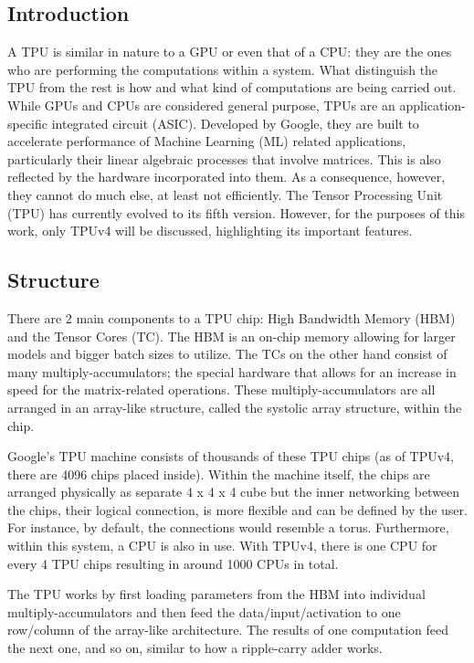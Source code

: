 \subsection{Introduction}
\label{subsec:introduction2}
A TPU is similar in nature to a GPU or even that of a CPU: they are the ones who are performing the computations within a system.
What distinguish the TPU from the rest is how and what kind of computations are being carried out.
While GPUs and CPUs are considered general purpose, TPUs are an application-specific integrated circuit (ASIC).
Developed by Google, they are built to accelerate performance of Machine Learning (ML) related applications, particularly their linear algebraic processes that involve matrices.
This is also reflected by the hardware incorporated into them.
As a consequence, however, they cannot do much else, at least not efficiently.
The Tensor Processing Unit (TPU) has currently evolved to its fifth version.
However, for the purposes of this work, only TPUv4 will be discussed, highlighting its important features.

\subsection{Structure}
\label{subsec:structure}
There are 2 main components to a TPU chip: High Bandwidth Memory (HBM) and the Tensor Cores (TC).
The HBM is an on-chip memory allowing for larger models and bigger batch sizes to utilize.
The TCs on the other hand consist of many multiply-accumulators; the special hardware that allows for an increase in speed for the matrix-related operations.
These multiply-accumulators are all arranged in an array-like structure, called the systolic array structure, within the chip.

Google’s TPU machine consists of thousands of these TPU chips (as of TPUv4, there are 4096 chips placed inside).
Within the machine itself, the chips are arranged physically as separate 4 x 4 x 4 cube but the inner networking between the chips, their logical connection, is more flexible and can be defined by the user.
For instance, by default, the connections would resemble a torus.
Furthermore, within this system, a CPU is also in use.
With TPUv4, there is one CPU for every 4 TPU chips resulting in around 1000 CPUs in total.

The TPU works by first loading parameters from the HBM into individual multiply-accumulators and then feed the data/input/activation to one row/column of the array-like architecture.
The results of one computation feed the next one, and so on, similar to how a ripple-carry adder works.

